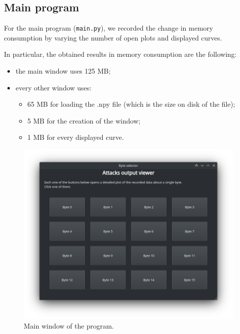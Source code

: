 \documentclass[11pt,a4paper]{article}
\begin{document}
\subsection{Main program}

For the main program (\texttt{main.py}), we recorded the change in memory consumption by varying the number of open plots and displayed curves.

In particular, the obtained results in memory consumption are the following:
\begin{itemize}
    \item the main window uses 125 MB;
    \item every other window uses:
    \begin{itemize}
    		\item 65 MB for loading the .npy file (which is the size on disk of the file);
    		\item 5 MB for the creation of the window;
    		\item 1 MB for every displayed curve.
	\end{itemize}
\end{itemize}

\begin{figure}[H]
    \centering
    \includegraphics[scale=0.6]{main_window.png}
    \caption{Main window of the program.}
    \label{fig:main_window}
\end{figure}
\end{document}

